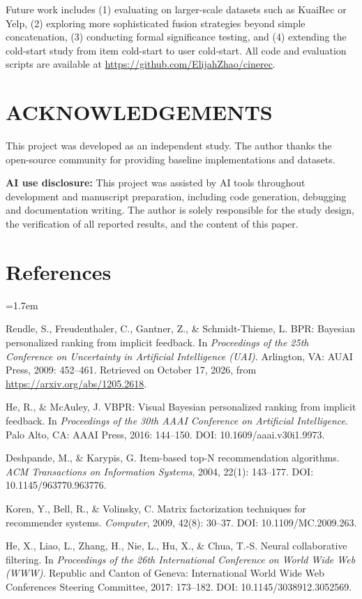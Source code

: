 \documentclass[11pt,a4paper]{article}
\newcommand{\refsfont}{\fontsize{9}{11}\selectfont}
\begin{document}
Future work includes (1) evaluating on larger-scale datasets such as KuaiRec or
Yelp, (2) exploring more sophisticated fusion strategies beyond simple
concatenation, (3) conducting formal significance testing, and (4) extending the
cold-start study from item cold-start to user cold-start. All code and evaluation
scripts are available at \url{https://github.com/ElijahZhao/cinerec}.

\section*{ACKNOWLEDGEMENTS}
This project was developed as an independent study. The author thanks the
open-source community for providing baseline implementations and datasets.

\textbf{AI use disclosure:} This project was assisted by AI tools throughout
development and manuscript preparation, including code generation, debugging and
documentation writing. The author is solely responsible for the study design,
the verification of all reported results, and the content of this paper.

\section*{References}
\begingroup
\refsfont
\setlength{\parskip}{3pt}
\hangindent=1.7em 

\noindent [1] Rendle, S., Freudenthaler, C., Gantner, Z., \& Schmidt-Thieme, L.
BPR: Bayesian personalized ranking from implicit feedback. In \emph{Proceedings
of the 25th Conference on Uncertainty in Artificial Intelligence (UAI)}.
Arlington, VA: AUAI Press, 2009: 452--461. Retrieved on October 17, 2026, from
\url{https://arxiv.org/abs/1205.2618}.

\noindent [2] He, R., \& McAuley, J. VBPR: Visual Bayesian personalized ranking
from implicit feedback. In \emph{Proceedings of the 30th AAAI Conference on
Artificial Intelligence}. Palo Alto, CA: AAAI Press, 2016: 144--150. DOI:
10.1609/aaai.v30i1.9973.

\noindent [3] Deshpande, M., \& Karypis, G. Item-based top-N recommendation
algorithms. \emph{ACM Transactions on Information Systems}, 2004, 22(1):
143--177. DOI: 10.1145/963770.963776.

\noindent [4] Koren, Y., Bell, R., \& Volinsky, C. Matrix factorization
techniques for recommender systems. \emph{Computer}, 2009, 42(8): 30--37. DOI:
10.1109/MC.2009.263.

\noindent [5] He, X., Liao, L., Zhang, H., Nie, L., Hu, X., \& Chua, T.-S.
Neural collaborative filtering. In \emph{Proceedings of the 26th International
Conference on World Wide Web (WWW)}. Republic and Canton of Geneva:
International World Wide Web Conferences Steering Committee, 2017: 173--182.
DOI: 10.1145/3038912.3052569.
\end{document}
